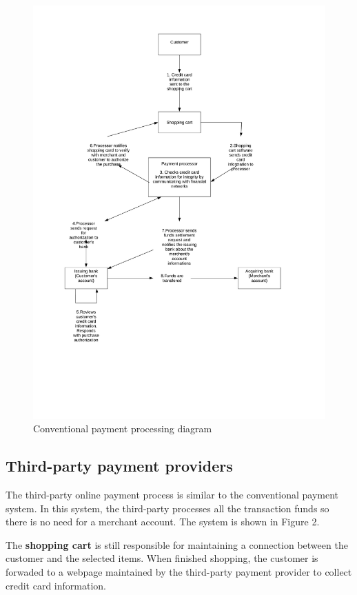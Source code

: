\documentclass{ferseminar}
\begin{document}
\begin{figure}[p]
	\caption{Conventional payment processing diagram}
	\includegraphics[scale=0.7]{diagram1}
	\centering
\end{figure}


\subsection{Third-party payment providers}

The third-party online payment process is similar to the conventional payment system. In this system, the third-party processes all the transaction funds so there is no need for a merchant account. The system is shown in Figure 2. 

The \textbf{shopping cart} is still responsible for maintaining a connection between the customer and the selected items. When finished shopping, the customer is forwaded to a webpage maintained by the third-party payment provider to collect credit card information.
\end{document}
